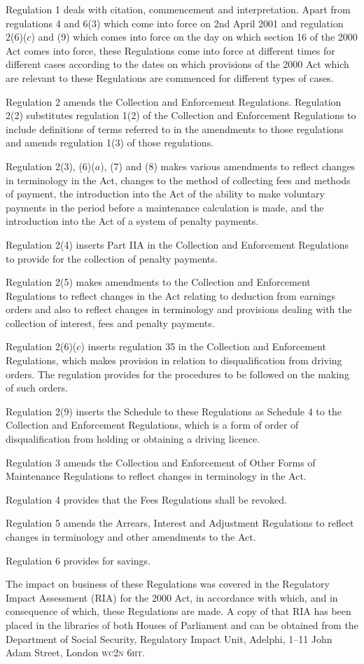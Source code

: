 \documentclass[12pt,a4paper]{article}
\begin{document}
Regulation 1 deals with citation, commencement and interpretation. Apart from regulations 4 and 6(3) which come into force on 2nd April 2001 and regulation 2(6)($c$)  and (9) which comes into force on the day on which section 16 of the 2000 Act comes into force, these Regulations come into force at different times for different cases according to the dates on which provisions of the 2000 Act which are relevant to these Regulations are commenced for different types of cases.

Regulation 2 amends the Collection and Enforcement Regulations. Regulation 2(2) substitutes regulation 1(2) of the Collection and Enforcement Regulations to include definitions of terms referred to in the amendments to those regulations and amends regulation 1(3) of those regulations.

Regulation 2(3), (6)($a$), (7) and (8) makes various amendments to reflect changes in terminology in the Act, changes to the method of collecting fees and methods of payment, the introduction into the Act of the ability to make voluntary payments in the period before a maintenance calculation is made, and the introduction into the Act of a system of penalty payments.

Regulation 2(4) inserts Part IIA in the Collection and Enforcement Regulations to provide for the collection of penalty payments.

Regulation 2(5) makes amendments to the Collection and Enforcement Regulations to reflect changes in the Act relating to deduction from earnings orders and also to reflect changes in terminology and provisions dealing with the collection of interest, fees and penalty payments.

Regulation 2(6)($c$)  inserts regulation 35 in the Collection and Enforcement Regulations, which makes provision in relation to disqualification from driving orders. The regulation provides for the procedures to be followed on the making of such orders.

Regulation 2(9) inserts the Schedule to these Regulations as Schedule 4 to the Collection and Enforcement Regulations, which is a form of order of disqualification from holding or obtaining a driving licence.

Regulation 3 amends the Collection and Enforcement of Other Forms of Maintenance Regulations to reflect changes in terminology in the Act.

Regulation 4 provides that the Fees Regulations shall be revoked.

Regulation 5 amends the Arrears, Interest and Adjustment Regulations to reflect changes in terminology and other amendments to the Act.

Regulation 6 provides for savings.

The impact on business of these Regulations was covered in the Regulatory Impact Assessment (RIA) for the 2000 Act, in accordance with which, and in consequence of which, these Regulations are made. A copy of that RIA has been placed in the libraries of both Houses of Parliament and can be obtained from the Department of Social Security, Regulatory Impact Unit, Adelphi, 1--11 John Adam Street, London \textsc{\lowercase{WC2N 6HT}}. 
\end{document}
